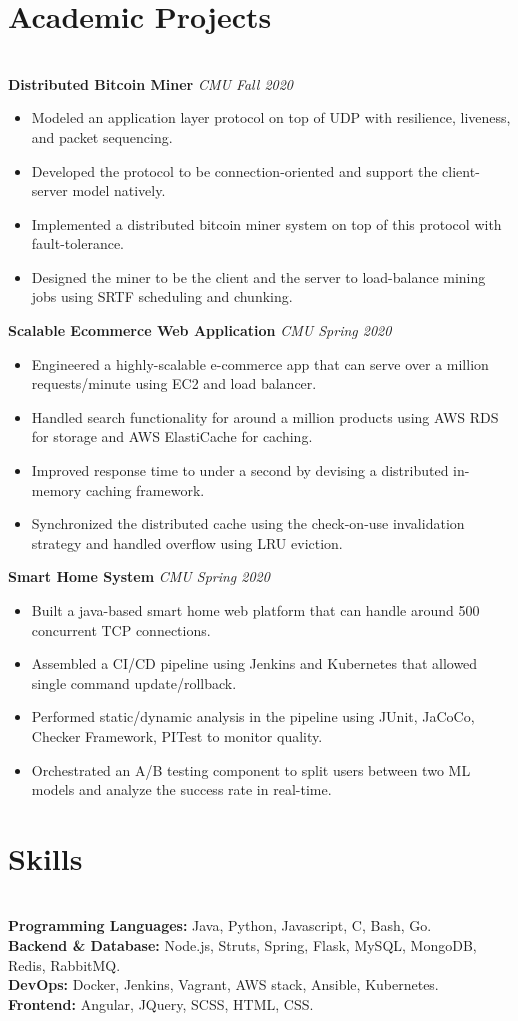 \documentclass{resume}
\begin{document}
\section*{Academic Projects}
\titlerule
\noindent
\\
\textbf{Distributed Bitcoin Miner} \hfill \textit{CMU Fall 2020}
\begin{itemize}
  \item Modeled an application layer protocol on top of UDP with resilience, liveness, and packet sequencing.
  \item Developed the protocol to be connection-oriented and support the client-server model natively.
  \item Implemented a distributed bitcoin miner system on top of this protocol with fault-tolerance.
  \item Designed the miner to be the client and the server to load-balance mining jobs using SRTF scheduling and chunking.
\end{itemize}
\textbf{Scalable Ecommerce Web Application} \hfill \textit{CMU Spring 2020}
\begin{itemize}
  \item Engineered a highly-scalable e-commerce app that can serve over a million requests/minute using EC2 and load balancer.
  \item Handled search functionality for around a million products using AWS RDS for storage and AWS ElastiCache for caching.
  \item Improved response time to under a second by devising a distributed in-memory caching framework.
  \item Synchronized the distributed cache using the check-on-use invalidation strategy and handled overflow using LRU eviction.
\end{itemize}
\textbf{Smart Home System} \hfill \textit{CMU Spring 2020}
\begin{itemize}
  \item Built a java-based smart home web platform that can handle around 500 concurrent TCP connections.
  \item Assembled a CI/CD pipeline using Jenkins and Kubernetes that allowed single command update/rollback.
  \item Performed static/dynamic analysis in the pipeline using JUnit, JaCoCo, Checker Framework, PITest to monitor quality.
  \item Orchestrated an A/B testing component to split users between two ML models and analyze the success rate in real-time.
\end{itemize}
\section*{Skills}
\titlerule
\noindent
\\
\textbf{Programming Languages:} Java, Python, Javascript, C, Bash, Go. \\
\textbf{Backend \& Database:} Node.js, Struts, Spring, Flask, MySQL, MongoDB, Redis, RabbitMQ. \\
\textbf{DevOps:} Docker, Jenkins, Vagrant, AWS stack, Ansible, Kubernetes. \\
\textbf{Frontend:} Angular, JQuery, SCSS, HTML, CSS.
\end{document}
